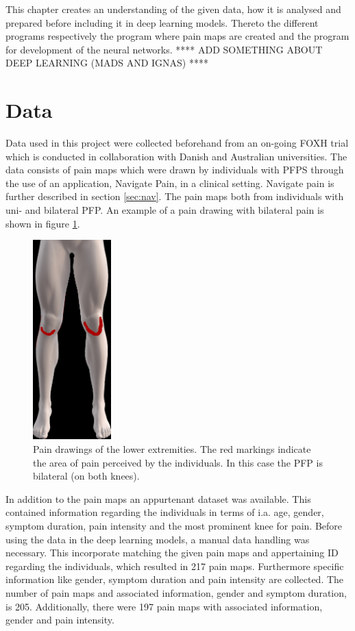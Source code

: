 This chapter creates an understanding of the given data, how it is analysed and prepared before including it in deep learning models. Thereto the different programs respectively the program where pain maps are created and the program for development of the neural networks. **** ADD SOMETHING ABOUT DEEP LEARNING (MADS AND IGNAS) ****


\section{Data}
Data used in this project were collected beforehand from an on-going FOXH trial which is conducted in collaboration with Danish and Australian universities. The data consists of pain maps which were drawn by individuals with PFPS through the use of an application, Navigate Pain, in a clinical setting. Navigate pain is further described in section \ref{sec:nav}. The pain maps both from individuals with uni- and bilateral PFP. An example of a pain drawing with bilateral pain is shown in figure \ref{fig:kneepainmap}.

\begin{figure} [H]
\centering
\includegraphics[width=0.27\textwidth]{figures/kneepainmap}
\caption{Pain drawings of the lower extremities. The red markings indicate the area of pain perceived by the individuals. In this case the PFP is bilateral (on both knees).}
\label{fig:kneepainmap}
\end{figure}

\noindent
In addition to the pain maps an appurtenant dataset was available. This contained information regarding the individuals in terms of i.a. age, gender, symptom duration, pain intensity and the most prominent knee for pain.
Before using the data in the deep learning models, a manual data handling was necessary. This incorporate matching the given pain maps and appertaining ID regarding the individuals, which resulted in 217 pain maps. Furthermore specific information like gender, symptom duration and pain intensity are collected. The number of pain maps and associated information, gender and symptom duration, is 205. Additionally, there were 197 pain maps with associated information, gender and pain intensity.



